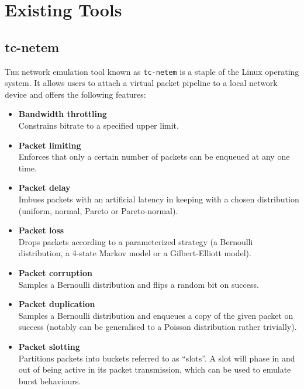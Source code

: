 \section{Existing Tools}\label{section:existing_tools}

\subsection{tc-netem}\label{subsection:tc_netem}

\lettrine{T}{he} network emulation tool known as \texttt{tc-netem} is a staple of the Linux operating
system\cite{tc_netem_wiki, tc_netem_8_man,tc_netem_src}. It allows users to attach a virtual packet pipeline to a
local network device and offers the following features:
\begin{itemize}
    \item \textbf{Bandwidth throttling} \\
    Constrains bitrate to a specified upper limit.
    \item \textbf{Packet limiting} \\
    Enforces that only a certain number of packets can be enqueued at any one time.
    \item \textbf{Packet delay} \\
    Imbues packets with an artificial latency in keeping with a chosen distribution (uniform, normal, Pareto or
    Pareto-normal).
    \item \textbf{Packet loss} \\
    Drops packets according to a parameterized strategy (a Bernoulli distribution, a 4-state Markov model or a
    Gilbert-Elliott model\cite{ge_model}).
    \item \textbf{Packet corruption} \\
    Samples a Bernoulli distribution and flips a random bit on success.
    \item \textbf{Packet duplication} \\
    Samples a Bernoulli distribution and enqueues a copy of the given packet on success (notably can be generalised to a
    Poisson distribution rather trivially).
    \item \textbf{Packet slotting} \\
    Partitions packets into buckets referred to as ``slots''. A slot will phase in and out of being active in its
    packet transmission, which can be used to emulate burst behaviours.
\end{itemize}

